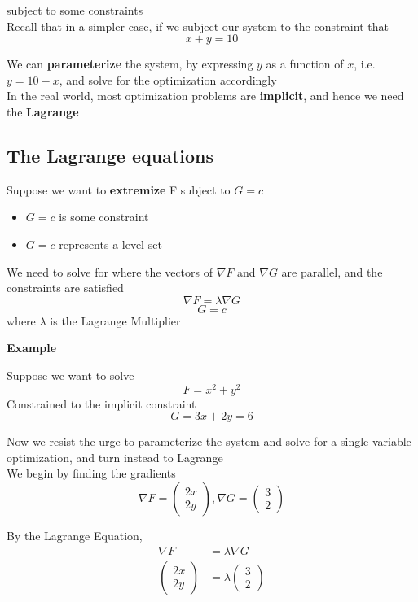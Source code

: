 subject to some constraints \\

Recall that in a simpler case, if we subject our system to the constraint that \[
  x + y = 10
\] 

We can \textbf{parameterize} the system, by expressing $y$ as a function of $x$, i.e. $y = 10 -x$, and solve for the optimization accordingly\\

In the real world, most optimization problems are \textbf{implicit}, and hence we need the \textbf{Lagrange} \\

\subsection{The Lagrange equations}

Suppose we want to \textbf{extremize} F subject to $G = c$
 \begin{itemize}
    \item $G = c$ is some constraint
    \item $G = c$ represents a level set
\end{itemize}

\begin{framed}
We need to solve for where the vectors of $\nabla F$ and $\nabla G$ are parallel, and the constraints are satisfied
\[
  \nabla F  = \lambda \nabla G
\] 
\[
  G = c
\] 
where $\lambda$ is the Lagrange Multiplier
\end{framed}

\textbf{Example}

Suppose we want to solve
\[
  F = x^2 + y^2
\] 
Constrained to the implicit constraint
\[
  G = 3x + 2y = 6
\] 

Now we resist the urge to parameterize the system and solve for a single variable optimization, and turn instead to Lagrange \\

We begin by finding the gradients
\[
  \nabla F = \begin{pmatrix} 2x \\ 2y \end{pmatrix} , \nabla G = \begin{pmatrix} 3 \\2 \end{pmatrix} 
\] 

By the Lagrange Equation, 
\begin{align*}
   \nabla F &= \lambda \nabla G \\
   \begin{pmatrix} 2x \\ 2y \end{pmatrix} &= \lambda \begin{pmatrix} 3 \\2 \end{pmatrix} 
\end{align*}

